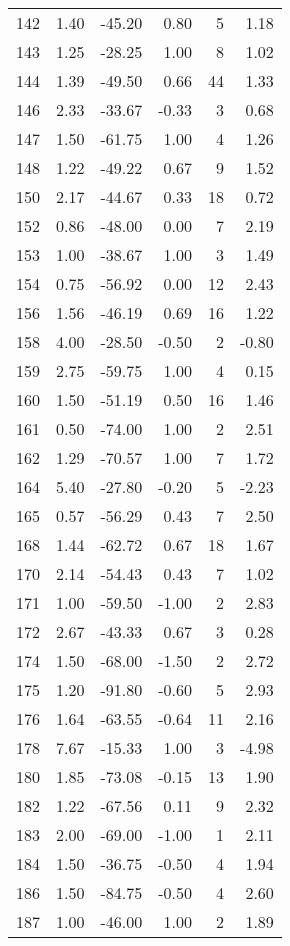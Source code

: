 \begin{appendices}
\begin{longtable}[c]{@{}rrrrrr@{}}
142 & 1.40 & -45.20 & 0.80 & 5 & 1.18 \\
143 & 1.25 & -28.25 & 1.00 & 8 & 1.02 \\
144 & 1.39 & -49.50 & 0.66 & 44 & 1.33 \\
146 & 2.33 & -33.67 & -0.33 & 3 & 0.68 \\
147 & 1.50 & -61.75 & 1.00 & 4 & 1.26 \\
148 & 1.22 & -49.22 & 0.67 & 9 & 1.52 \\
150 & 2.17 & -44.67 & 0.33 & 18 & 0.72 \\
152 & 0.86 & -48.00 & 0.00 & 7 & 2.19 \\
153 & 1.00 & -38.67 & 1.00 & 3 & 1.49 \\
154 & 0.75 & -56.92 & 0.00 & 12 & 2.43 \\
156 & 1.56 & -46.19 & 0.69 & 16 & 1.22 \\
158 & 4.00 & -28.50 & -0.50 & 2 & -0.80 \\
159 & 2.75 & -59.75 & 1.00 & 4 & 0.15 \\
160 & 1.50 & -51.19 & 0.50 & 16 & 1.46 \\
161 & 0.50 & -74.00 & 1.00 & 2 & 2.51 \\
162 & 1.29 & -70.57 & 1.00 & 7 & 1.72 \\
164 & 5.40 & -27.80 & -0.20 & 5 & -2.23 \\
165 & 0.57 & -56.29 & 0.43 & 7 & 2.50 \\
168 & 1.44 & -62.72 & 0.67 & 18 & 1.67 \\
170 & 2.14 & -54.43 & 0.43 & 7 & 1.02 \\
171 & 1.00 & -59.50 & -1.00 & 2 & 2.83 \\
172 & 2.67 & -43.33 & 0.67 & 3 & 0.28 \\
174 & 1.50 & -68.00 & -1.50 & 2 & 2.72 \\
175 & 1.20 & -91.80 & -0.60 & 5 & 2.93 \\
176 & 1.64 & -63.55 & -0.64 & 11 & 2.16 \\
178 & 7.67 & -15.33 & 1.00 & 3 & -4.98 \\
180 & 1.85 & -73.08 & -0.15 & 13 & 1.90 \\
182 & 1.22 & -67.56 & 0.11 & 9 & 2.32 \\
183 & 2.00 & -69.00 & -1.00 & 1 & 2.11 \\
184 & 1.50 & -36.75 & -0.50 & 4 & 1.94 \\
186 & 1.50 & -84.75 & -0.50 & 4 & 2.60 \\
187 & 1.00 & -46.00 & 1.00 & 2 & 1.89 \\

\end{longtable}
\end{appendices}

